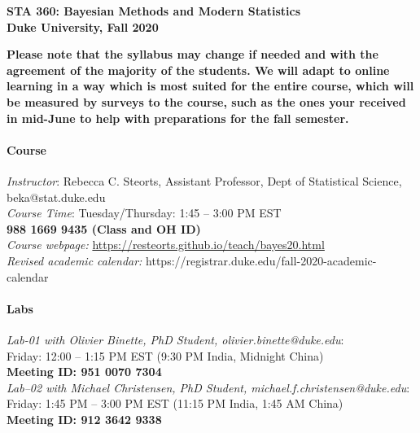 \documentclass[11pt]{article}
\date{}
\begin{document}
\begin{center}
{\Large\bf STA 360: Bayesian Methods and Modern Statistics} \\

{\Large\bf Duke University, Fall 2020} \\
\end{center}

\textbf{Please note that the syllabus may change if needed and with the agreement of the majority of the students. We will adapt to online learning in a way which is most suited for the entire course, which will be measured by surveys to the course, such as the ones your received in mid-June to help with preparations for the fall semester.} \\

\paragraph{Course}
\emph{Instructor}: Rebecca C. Steorts,  Assistant Professor, Dept of Statistical Science, beka@stat.duke.edu\\
\emph{Course Time}: Tuesday/Thursday: 1:45 -- 3:00 PM EST \\
\textbf{988 1669 9435 (Class and OH ID)}\\
\emph{Course webpage:} \url{https://resteorts.github.io/teach/bayes20.html} \\
\emph{Revised academic calendar:} https://registrar.duke.edu/fall-2020-academic-calendar


\paragraph{Labs}
\emph{Lab-01 with Olivier Binette, PhD Student, olivier.binette@duke.edu}: \\Friday: 12:00 -- 1:15 PM EST (9:30 PM India, Midnight China)\\
\textbf{Meeting ID: 951 0070 7304}\\
\emph{Lab--02 with Michael Christensen, PhD Student, michael.f.christensen@duke.edu}: \\Friday: 1:45 PM -- 3:00 PM EST (11:15 PM India, 1:45 AM China)\\
\textbf{Meeting ID: 912 3642 9338}
\end{document}
